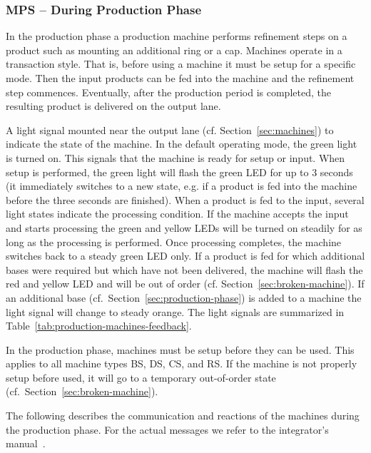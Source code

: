 \documentclass[12pt,twoside]{article}
\newcommand{\refsec}[1]{Section~\ref{#1}}
\newcommand{\reftab}[1]{Table~\ref{#1}}
\begin{document}
\vspace*{-2mm}
\subsubsection{MPS -- During Production Phase}
\label{sec:production-machines-production}
In the production phase a production machine performs refinement steps on
a product such as mounting an additional ring or a cap. Machines
operate in a transaction style. That is, before using a machine it
must be setup for a specific mode. Then the input products can be fed
into the machine and the refinement step commences. Eventually, after
the production period is completed, the resulting product is delivered
on the output lane.

A light signal mounted near the output lane
(cf. \refsec{sec:machines}) to indicate the state of the machine. In
the default operating mode, the green light is turned on. This signals
that the machine is ready for setup or input. When setup is performed,
the green light will flash the green LED for up to 3 seconds (it
immediately switches to a new state, e.g. if a product is fed into the
machine before the three seconds are finished). When a product is fed
to the input, several light states indicate the processing
condition. If the machine accepts the input and starts processing the
green and yellow LEDs will be turned on steadily for as long as the
processing is performed. Once processing completes, the machine
switches back to a steady green LED only. If a product is fed for
which additional bases were required but which have not been
delivered, the machine will flash the red and yellow LED and will be
out of order (cf. \refsec{sec:broken-machine}). If an additional base
(cf.~\refsec{sec:production-phase}) is added to a machine the light
signal will change to steady orange. The light signals are summarized
in \reftab{tab:production-machines-feedback}.

In the production phase, machines must be setup before they can be
used. This applies to all machine types BS, DS, CS, and RS. If the
machine is not properly setup before used, it will go to a temporary
out-of-order state (cf.~\refsec{sec:broken-machine}).

The following describes the communication and reactions of the
machines during the production phase. For the actual messages we refer
to the integrator's manual~\cite{RefBoxIntManual}.
\end{document}
